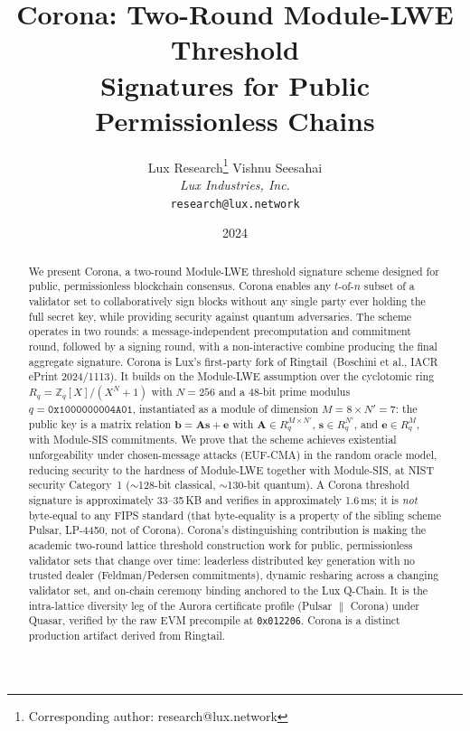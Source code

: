 \documentclass[11pt,a4paper]{article}
\title{\textbf{Corona: Two-Round Module-LWE Threshold\\Signatures for Public Permissionless Chains}}
\author{
Lux Research\thanks{Corresponding author: research@lux.network}
\quad
Vishnu Seesahai\\
\textit{Lux Industries, Inc.}\\
\texttt{research@lux.network}
}
\date{2024}
\begin{document}
\luxcoverpage

\begin{abstract}
We present Corona, a two-round Module-LWE threshold signature scheme designed for
public, permissionless blockchain consensus. Corona enables any $t$-of-$n$ subset of
a validator set to collaboratively sign blocks without any single party ever holding
the full secret key, while providing security against quantum adversaries. The scheme
operates in two rounds: a message-independent precomputation and commitment round,
followed by a signing round, with a non-interactive combine producing the final
aggregate signature.
Corona is Lux's first-party fork of Ringtail~(Boschini et al., IACR ePrint 2024/1113).
It builds on the Module-LWE assumption over the cyclotomic ring
$R_q = \mathbb{Z}_q[X]/(X^N + 1)$ with $N = 256$ and a 48-bit prime modulus
$q = \texttt{0x1000000004A01}$, instantiated as a module of dimension $M = 8 \times N' = 7$:
the public key is a matrix relation $\mathbf{b} = \mathbf{A}\mathbf{s} + \mathbf{e}$ with
$\mathbf{A} \in R_q^{M \times N'}$, $\mathbf{s} \in R_q^{N'}$, and $\mathbf{e} \in R_q^{M}$,
with Module-SIS commitments. We prove that the scheme achieves existential unforgeability
under chosen-message attacks (EUF-CMA) in the random oracle model, reducing security to
the hardness of Module-LWE together with Module-SIS, at NIST security Category~1
($\sim$128-bit classical, $\sim$130-bit quantum). A Corona threshold signature is
approximately 33--35\,KB and verifies in approximately 1.6\,ms; it is \emph{not}
byte-equal to any FIPS standard (that byte-equality is a property of the sibling scheme
Pulsar, LP-4450, not of Corona).
Corona's distinguishing contribution is making the academic two-round lattice threshold
construction work for public, permissionless validator sets that change over time:
leaderless distributed key generation with no trusted dealer (Feldman/Pedersen
commitments), dynamic resharing across a changing validator set, and on-chain ceremony
binding anchored to the Lux Q-Chain. It is the intra-lattice diversity leg of the
Aurora certificate profile (Pulsar $\|$ Corona) under Quasar, verified by the raw EVM
precompile at \texttt{0x012206}. Corona is a distinct production artifact derived from
Ringtail.
\end{abstract}

\tableofcontents
\newpage










\end{document}
